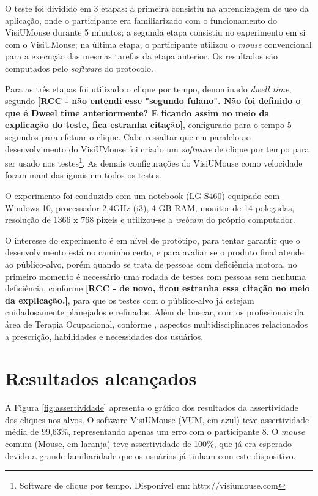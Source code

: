 O teste foi dividido em 3 etapas: a primeira consistiu na aprendizagem de uso da aplicação, onde o participante era familiarizado com o funcionamento do VisiUMouse durante 5 minutos; a segunda etapa consistiu no experimento em si com o VisiUMouse; na última etapa, o participante utilizou o \textit{mouse} convencional para a execução das mesmas tarefas da etapa anterior. Os resultados são computados pelo \textit{software} do protocolo.

Para as três etapas foi utilizado o clique por tempo, denominado \textit{dwell time}, segundo  \textbf{[RCC - não entendi esse "segundo fulano". Não foi definido o que é Dweel time anteriormente? E ficando assim no meio da explicação do teste, fica estranha citação]}, configurado para o tempo 5 segundos para efetuar o clique. Cabe ressaltar que em paralelo ao desenvolvimento do VisiUMouse foi criado um \textit{software} de clique por tempo para ser usado nos testes\footnote{Software de clique por tempo. Disponível em: http://visiumouse.com}. As demais configurações do VisiUMouse como velocidade foram mantidas iguais em todos os testes.  

O experimento foi conduzido com um notebook (LG S460) equipado com Windows 10, processador 2,4GHz (i3), 4 GB RAM, monitor de 14 polegadas, resolução de 1366 x 768 pixeis e utilizou-se a \textit{webcam} do próprio computador.

O interesse do experimento é em nível de protótipo, para tentar garantir que o desenvolvimento está no caminho certo, e para avaliar se o produto final atende ao público-alvo, porém quando se trata de pessoas com deficiência motora, no primeiro momento é necessário uma rodada de testes com pessoas sem nenhuma deficiência, conforme \cite{stone2005user} \textbf{[RCC - de novo, ficou estranha essa citação no meio da explicação.]}, para que os testes com o público-alvo já estejam cuidadosamente planejados e refinados. Além de buscar, com os profissionais da área de Terapia Ocupacional, conforme \cite{oliveira2015uso}, aspectos multidisciplinares relacionados a prescrição, habilidades e necessidades dos usuários.

\section{Resultados alcançados}\label{Sub:resultados-ex-1}
A Figura \ref{fig:assertividade} apresenta o gráfico dos resultados da assertividade dos cliques nos alvos. O software VisiUMouse (VUM, em azul) teve assertividade média de 99,63\%, representando apenas um erro com o participante 8. O \textit{mouse} comum (Mouse, em laranja) teve assertividade de 100\%, que já era esperado devido a grande familiaridade que os usuários já tinham com este dispositivo.

